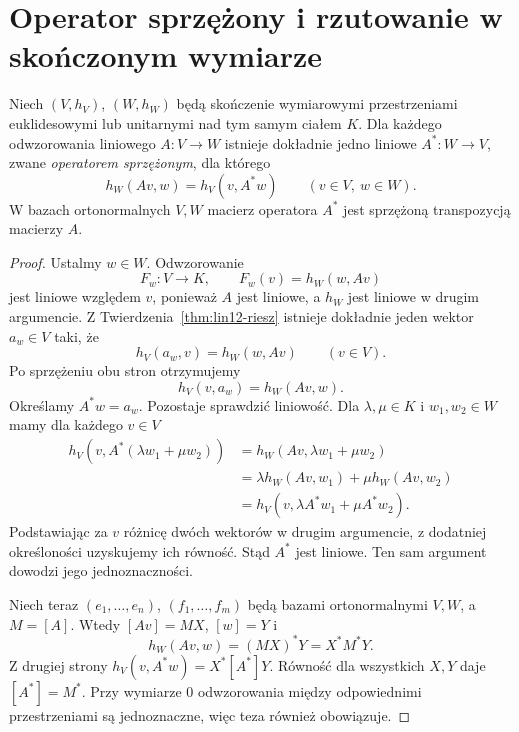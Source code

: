 \section{Operator sprzężony i rzutowanie w skończonym wymiarze}
\label{sec:lin13-operator-sprzezony}

\begin{twierdzenie}
\label{thm:lin13-adjoint}
Niech \((V,h_V)\), \((W,h_W)\)
będą skończenie wymiarowymi
przestrzeniami euklidesowymi
lub unitarnymi nad tym samym ciałem \(K\).
Dla każdego odwzorowania liniowego
\(A\colon V\to W\)
istnieje dokładnie jedno liniowe
\(A^*\colon W\to V\), zwane
\emph{operatorem sprzężonym},
dla którego
\[
 h_W(Av,w)=h_V(v,A^*w)
 \qquad(v\in V,\ w\in W).
\]
W bazach ortonormalnych \(V,W\)
macierz operatora \(A^*\) jest
sprzężoną transpozycją macierzy \(A\).
\end{twierdzenie}
\begin{proof}
Ustalmy \(w\in W\).
Odwzorowanie
\[
 F_w\colon V\to K,\qquad
 F_w(v)=h_W(w,Av)
\]
jest liniowe względem \(v\),
ponieważ \(A\) jest liniowe,
a \(h_W\) jest liniowe
w drugim argumencie.
Z
Twierdzenia~\ref{thm:lin12-riesz}
istnieje dokładnie jeden
wektor \(a_w\in V\) taki, że
\[
 h_V(a_w,v)=h_W(w,Av)
 \qquad(v\in V).
\]
Po sprzężeniu obu stron
otrzymujemy
\[
 h_V(v,a_w)=h_W(Av,w).
\]
Określamy \(A^*w=a_w\).
Pozostaje sprawdzić liniowość.
Dla \(\lambda,\mu\in K\)
i \(w_1,w_2\in W\)
mamy dla każdego \(v\in V\)
\[
 \begin{aligned}
 h_V(v,A^*(\lambda w_1+\mu w_2))
 &=h_W(Av,\lambda w_1+\mu w_2)\\
 &=\lambda h_W(Av,w_1)+
   \mu h_W(Av,w_2)\\
 &=h_V(v,\lambda A^*w_1+\mu A^*w_2).
 \end{aligned}
\]
Podstawiając za \(v\)
różnicę dwóch wektorów
w drugim argumencie,
z dodatniej określoności
uzyskujemy ich równość.
Stąd \(A^*\) jest liniowe.
Ten sam argument dowodzi
jego jednoznaczności.

Niech teraz
\((e_1,\ldots,e_n)\),
\((f_1,\ldots,f_m)\)
będą bazami ortonormalnymi
\(V,W\), a \(M=[A]\).
Wtedy \([Av]=MX\),
\([w]=Y\) i
\[
 h_W(Av,w)=(MX)^*Y=X^*M^*Y.
\]
Z drugiej strony
\(h_V(v,A^*w)=X^*[A^*]Y\).
Równość dla wszystkich
\(X,Y\) daje \([A^*]=M^*\).
Przy wymiarze \(0\)
odwzorowania między odpowiednimi
przestrzeniami są jednoznaczne,
więc teza również obowiązuje.
\end{proof}

